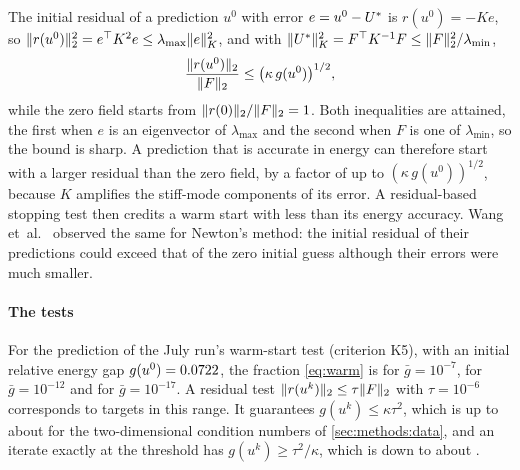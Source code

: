 \begin{remark}\label{rem:residual}
The initial residual of a prediction $u^0$ with error $e=u^0-U^{\ast}$ is $r(u^0)=-Ke$, so
$\lVert r(u^0)\rVert_2^2=e^{\top}K^2e\le\lambda_{\max}\lVert e\rVert_K^2$, and with
$\lVert U^{\ast}\rVert_K^2=F^{\top}K^{-1}F\le\lVert F\rVert_2^2/\lambda_{\min}$,
\begin{equation}
\frac{\lVert r(u^0)\rVert_2}{\lVert F\rVert_2} \le \bigl(\kappa\,g(u^0)\bigr)^{1/2},
\label{eq:residual}
\end{equation}
while the zero field starts from $\lVert r(0)\rVert_2/\lVert F\rVert_2=1$. Both inequalities are
attained, the first when $e$ is an eigenvector of $\lambda_{\max}$ and the second when $F$
is one of $\lambda_{\min}$, so the bound is sharp. A prediction that is accurate in energy
can therefore start with a larger residual than the zero field, by a factor of up to
$(\kappa\,g(u^0))^{1/2}$, because $K$ amplifies the stiff-mode components of its error. A residual-based stopping test
then credits a warm start with less than its energy accuracy.
Wang et~al.~\cite{Wang2026PretrainFEM} observed the same for Newton's method: the initial
residual of their predictions could exceed that of the zero initial guess although their
errors were much smaller.
\end{remark}

\paragraph{The tests}
For the prediction of the July run's warm-start test (criterion K5), with an initial
relative energy gap
$g(u^0)=0.0722$, the fraction \eqref{eq:warm} is \numWarmFractionSeven{} for $\bar
g=10^{-7}$, \numWarmFractionTwelve{} for $\bar g=10^{-12}$ and \numWarmFractionSeventeen{}
for $\bar g=10^{-17}$. A residual test $\lVert r(u^k)\rVert_2\le\tau\lVert F\rVert_2$ with $\tau=10^{-6}$
corresponds to targets in this range. It guarantees $g(u^k)\le\kappa\tau^2$, which is up to about
\numKappaTauTwo{} for the two-dimensional condition numbers of \cref{sec:methods:data}, and
an iterate exactly at the threshold has $g(u^k)\ge\tau^2/\kappa$, which is down to about
\numTauSqKappaTwo{}.

